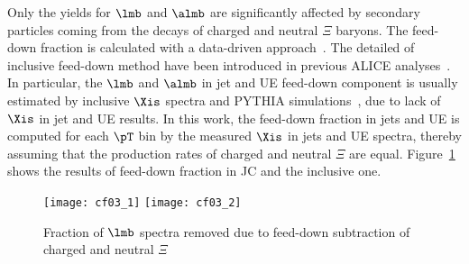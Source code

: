 \documentclass[ALICE,manyauthors]{cernphprep}
\begin{document}
Only the yields for $\lmb$ and $\almb$ are significantly affected by secondary particles coming from the decays of charged and neutral $\Xi$ baryons.
The feed-down fraction is calculated with a data-driven approach~\cite{Abelev:2013haa}.
The detailed of inclusive feed-down method have been introduced in previous ALICE analyses~\cite{Acharya:2019kyh, Acharya:2020uxl, ALICE:2017jyt}.
In particular, the $\lmb$ and $\almb$ in jet and UE feed-down component is usually estimated by inclusive $\Xis$ spectra and PYTHIA simulations~\cite{Acharya:2021oaa}, due to lack of $\Xis$ in jet and UE results.
In this work, the feed-down fraction in jets and UE is computed for each $\pT$ bin by the measured $\Xis$ in jets and UE spectra, thereby assuming that the production rates of charged and neutral $\Xi$ are equal.
Figure~\ref{fig:FdFrac} shows the results of feed-down fraction in JC and the inclusive one.
\begin{figure}[!ht]
	\begin{center}
		\texttt{[image: cf03\_1]}
		\texttt{[image: cf03\_2]}
	\end{center}
	\caption{Fraction of $\lmb$ spectra removed due to feed-down subtraction of charged and neutral $\Xi$}
	\label{fig:FdFrac}
\end{figure}
\end{document}

